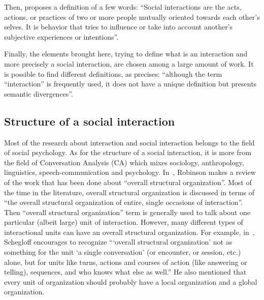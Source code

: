 \documentclass[a4paper,11pt,twoside]{StyleThese}
\begin{document}
Then, \cite{rummel_1976_understanding} proposes a definition of a few words: ``Social interactions are the acts, actions, or practices of two or more people mutually oriented towards each other's selves. It is behavior that tries to influence or take into account another's subjective experiences or intentions''.

Finally, the elements brought here, trying to define what is an interaction and more precisely a social interaction, are chosen among a large amount of work. It is possible to find different definitions, as \cite{enriquez_2017_vocabulaire} precises: ``although the term ``interaction'' is frequently used, it does not have a unique definition but presents semantic divergences''.

\subsection{Structure of a social interaction}\label{subsec:social_int}
Most of the research about interaction and social interaction belongs to the field of social psychology. As for the structure of a social interaction, it is more from the field of Conversation Analysis (CA) which mixes sociology, anthropology, linguistics, speech-communication and psychology.
In~\cite{robinson_overall_2012}, Robinson makes a review of the work that has been done about ``overall structural organization''. Most of the time in the literature, overall structural organization is discussed in terms of ``the overall structural organization of entire, single occasions of interaction''.  Then ``overall structural organization'' term is generally used to talk about one particular (albeit large) unit of interaction. However, many different types of interactional units can have an overall structural organization. For example, in~\cite{schegloff_2011_word}, Schegloff encourages to recognize ``‘overall structural organization’ not as something for the unit ‘a single conversation’ (or encounter, or session, etc.) alone, but for units like turns, actions and courses of action (like answering or telling), sequences, and who knows what else as well.'' He also mentioned that every unit of organization should probably have a local organization and a global organization.
\end{document}
